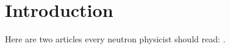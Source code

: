 \section{Introduction}
\label{sec:introduction}

Here are two articles every neutron physicist should
read: \cite{Gentile2011, Plaster2012}.
